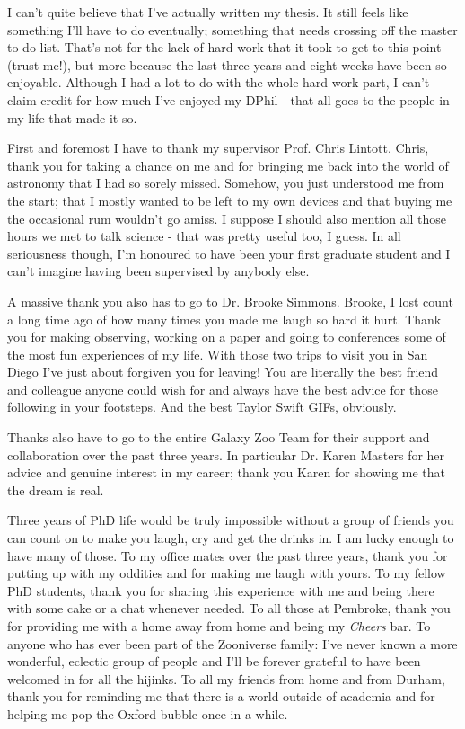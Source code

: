 \documentclass[12pt,useAMS]{ociamthesis}  %
\begin{document}
\begin{acknowledgements}


I can't quite believe that I've actually written my thesis. It still feels like something I'll have to do eventually; something that needs crossing off the master to-do list. That's not for the lack of hard work that it took to get to this point (trust me!), but more because the last three years and eight weeks have been so enjoyable. Although I had a lot to do with the whole hard work part, I can't claim credit for how much I've enjoyed my DPhil - that all goes to the people in my life that made it so. 

First and foremost I have to thank my supervisor Prof. Chris Lintott. Chris, thank you for taking a chance on me and for bringing me back into the world of astronomy that I had so sorely missed. Somehow, you just understood me from the start; that I mostly wanted to be left to my own devices and that buying me the occasional rum wouldn't go amiss. I suppose I should also mention all those hours we met to talk science - that was pretty useful too, I guess. In all seriousness though, I'm honoured to have been your first graduate student and I can't imagine having been supervised by anybody else. 

A massive thank you also has to go to Dr. Brooke Simmons. Brooke, I lost count a long time ago of how many times you made me laugh so hard it hurt. Thank you for making observing, working on a paper and going to conferences some of the most fun experiences of my life. With those two trips to visit you in San Diego I've just about forgiven you for leaving! You are literally the best friend and colleague anyone could wish for and always have the best advice for those following in your footsteps. And the best Taylor Swift GIFs, obviously. 

Thanks also have to go to the entire Galaxy Zoo Team for their support and collaboration over the past three years. In particular Dr. Karen Masters for her advice and genuine interest in my career; thank you Karen for showing me that the dream is real.

Three years of PhD life would be truly impossible without a group of friends you can count on to make you laugh, cry and get the drinks in. I am lucky enough to have many of those. To my office mates over the past three years, thank you for putting up with my oddities and for making me laugh with yours. To my fellow PhD students, thank you for sharing this experience with me and being there with some cake or a chat whenever needed. To all those at Pembroke, thank you for providing me with a home away from home and being my \emph{Cheers} bar. To anyone who has ever been part of the Zooniverse family: I've never known a more wonderful, eclectic group of people and I'll be forever grateful to have been welcomed in for all the hijinks. To all my friends from home and from Durham, thank you for reminding me that there is a world outside of academia and for helping me pop the Oxford bubble once in a while.


\end{acknowledgements}
\end{document}
